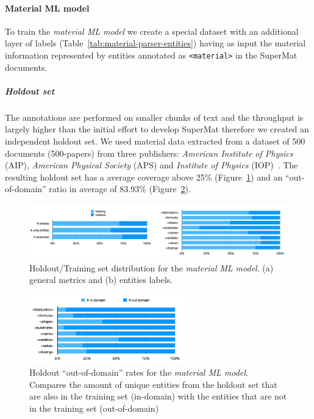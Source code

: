\documentclass[]{interact}
\theoremstyle{plain}%
\theoremstyle{definition}
\theoremstyle{remark}
\begin{document}
\paragraph*{Material ML model}

To train the \textit{material ML model} we create a special dataset with an additional layer of labels (Table~\ref{tab:material-parser-entities}) having as input the material information represented by entities annotated as \texttt{<material>} in the SuperMat documents.

\subparagraph*{Holdout set}
The annotations are performed on smaller chunks of text and the throughput is largely higher than the initial effort to develop SuperMat therefore we created an independent holdout set. 
We used material data extracted from a dataset of 500 documents (500-papers) from three publishers: \textit{American Institute of Physics} (AIP), \textit{American Physical Society} (APS) and \textit{Institute of Physics} (IOP)~\cite{foppiano2019proposal}.
The resulting holdout set has a average coverage above 25\% (Figure~\ref{fig:material-training-holdout-set-distribution}) and an ``out-of-domain'' ratio in average of 83.93\% (Figure~\ref{fig:material-out-domain-holdout}). 

\begin{figure}[ht]
\centering
\includegraphics[width=\textwidth]{material-holdout-training-set}
\caption{Holdout/Training set distribution for the \textit{material ML model}. (a) general metrics and (b) entities labels.}
\label{fig:material-training-holdout-set-distribution}
\end{figure}

\begin{figure}[ht]
\centering
\includegraphics[width=0.6\textwidth]{material-out-domain-holdout-unique}
\caption{Holdout ``out-of-domain'' rates for the \textit{material ML model}. Compares the amount of unique entities from the holdout set that are also in the training set (in-domain) with the entities that are not in the training set (out-of-domain)}
\label{fig:material-out-domain-holdout}
\end{figure}
\end{document}
